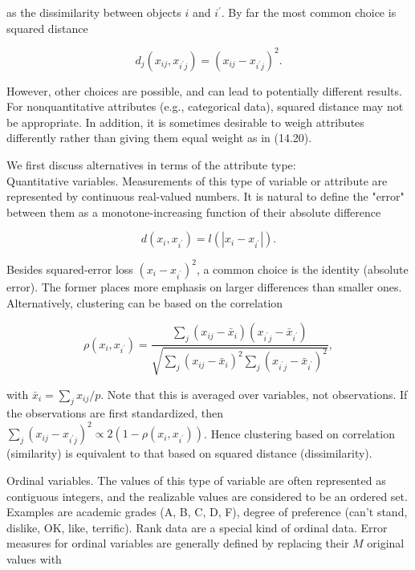 \documentclass[10pt]{article}
\begin{document}
as the dissimilarity between objects $i$ and $i^{\prime}$. By far the most common choice is squared distance


\begin{equation*}
d_{j}\left(x_{i j}, x_{i^{\prime} j}\right)=\left(x_{i j}-x_{i^{\prime} j}\right)^{2} . \tag{14.21}
\end{equation*}


However, other choices are possible, and can lead to potentially different results. For nonquantitative attributes (e.g., categorical data), squared distance may not be appropriate. In addition, it is sometimes desirable to weigh attributes differently rather than giving them equal weight as in (14.20).

We first discuss alternatives in terms of the attribute type:\\
Quantitative variables. Measurements of this type of variable or attribute are represented by continuous real-valued numbers. It is natural to define the "error" between them as a monotone-increasing function of their absolute difference

$$
d\left(x_{i}, x_{i^{\prime}}\right)=l\left(\left|x_{i}-x_{i^{\prime}}\right|\right) .
$$

Besides squared-error loss $\left(x_{i}-x_{i^{\prime}}\right)^{2}$, a common choice is the identity (absolute error). The former places more emphasis on larger differences than smaller ones. Alternatively, clustering can be based on the correlation


\begin{equation*}
\rho\left(x_{i}, x_{i^{\prime}}\right)=\frac{\sum_{j}\left(x_{i j}-\bar{x}_{i}\right)\left(x_{i^{\prime} j}-\bar{x}_{i^{\prime}}\right)}{\sqrt{\sum_{j}\left(x_{i j}-\bar{x}_{i}\right)^{2} \sum_{j}\left(x_{i^{\prime} j}-\bar{x}_{i^{\prime}}\right)^{2}}}, \tag{14.22}
\end{equation*}


with $\bar{x}_{i}=\sum_{j} x_{i j} / p$. Note that this is averaged over variables, not observations. If the observations are first standardized, then $\sum_{j}\left(x_{i j}-\right. \left.x_{i^{\prime} j}\right)^{2} \propto 2\left(1-\rho\left(x_{i}, x_{i^{\prime}}\right)\right)$. Hence clustering based on correlation (similarity) is equivalent to that based on squared distance (dissimilarity).

Ordinal variables. The values of this type of variable are often represented as contiguous integers, and the realizable values are considered to be an ordered set. Examples are academic grades (A, B, C, D, F), degree of preference (can't stand, dislike, OK, like, terrific). Rank data are a special kind of ordinal data. Error measures for ordinal variables are generally defined by replacing their $M$ original values with
\end{document}
